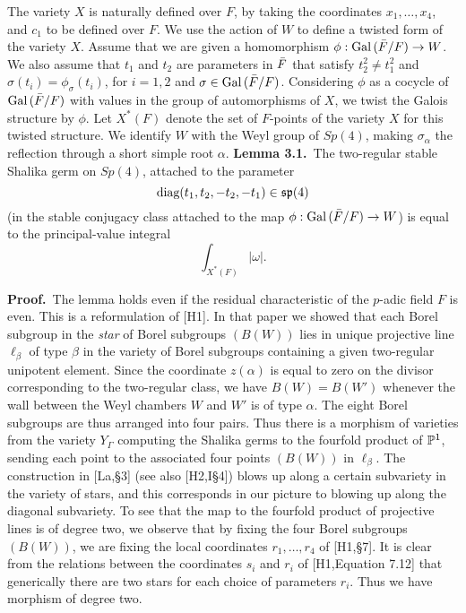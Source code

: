 The variety $X$ 
is naturally defined over $F$, by taking the coordinates
$x_1,\ldots,x_4$, and $c_1$ to be defined over $F$.  
We use the action of $W$ to define a twisted form of the variety $X$.
Assume that we are given
a homomorphism $\phi:\Gal(\bF/F)\to W$.  We also assume that
$t_1$ and $t_2$ are parameters in $\bF$ that satisfy
$t_2^2\ne t_1^2$ and
$\sigma(t_i) = \phi_\sigma(t_i)$, for $i=1,2$ and $\sigma\in \Gal(\bF/F)$.
Considering $\phi$ as a cocycle of $\Gal(\bF/F)$ with values in
the group of automorphisms of $X$, we twist
the Galois structure by $\phi$.
Let
$X^*(F)$ denote the set of $F$-points of the variety $X$ for this
twisted structure.
We identify $W$ with the Weyl group of $Sp(4)$, making $\sigma_\alpha$ the
reflection through a short simple root $\alpha$.
\bigskip
\noindent
{\bf Lemma 3.1.}\ 
The two-regular stable Shalika germ on
$Sp(4)$, attached to the parameter
$$\diag(t_1,t_2,-t_2,-t_1) \in \sp(4)$$ (in the stable conjugacy class
attached to the map $\phi:\Gal(\bF/F)\to W$) is equal to the
principal-value integral
$$\int_{X^*(F)} |\omega|.$$

\bigskip
\noindent
{\bf Proof.}\   The lemma holds even if the residual characteristic
of the $p$-adic field $F$ is even.
This is a reformulation of [H1].  In that paper we showed
that each Borel subgroup in 
the {\it star} of Borel subgroups $(B(W))$ lies in unique 
projective line
$\ell_\beta$ of type $\beta$ in the variety of Borel subgroups containing
a given two-regular unipotent element.  Since the coordinate $z(\alpha)$ is
equal to zero on the divisor corresponding to the two-regular class,
we have $B(W) = B(W')$ whenever the wall between the Weyl chambers
$W$ and $W'$ is of type $\alpha$.  
The eight Borel subgroups are thus arranged into four pairs.
Thus there is a morphism of varieties
from the variety $Y_\Gamma$ computing the Shalika germs to the fourfold
product of $\P^1$, sending each point to the associated four points
$(B(W))$ in $\ell_\beta$.   The construction in [La,\S3] (see also [H2,I\S4])
blows up along a certain subvariety in the variety of stars, and
this corresponds in our picture to blowing up along the diagonal subvariety.
To see that the map to the fourfold product of projective lines is
of degree two, we observe that by fixing the four Borel subgroups
$(B(W))$, we are fixing the local coordinates
$r_1,\ldots,r_4$ of [H1,\S7].  It is clear from the relations between the
coordinates $s_i$ and $r_i$ of [H1,Equation 7.12] that generically there are two
stars for each choice of parameters $r_i$.  Thus we have morphism
of degree two.


